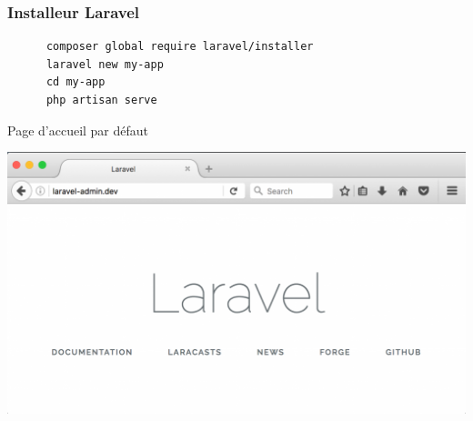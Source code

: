 \documentclass{beamer}
\begin{document}
\begin{frame}[fragile]
  \frametitle{Installeur Laravel}
  \begin{footnotesize}
    \begin{Verbatim}
      composer global require laravel/installer
      laravel new my-app
      cd my-app
      php artisan serve
    \end{Verbatim}
  \end{footnotesize}
\end{frame}

\begin{frame}{Page d'accueil par défaut}
\begin{center}
  \includegraphics[scale=0.4]{images/laravel-welcome-page.png}
\end{center}
\end{frame}
\end{document}
